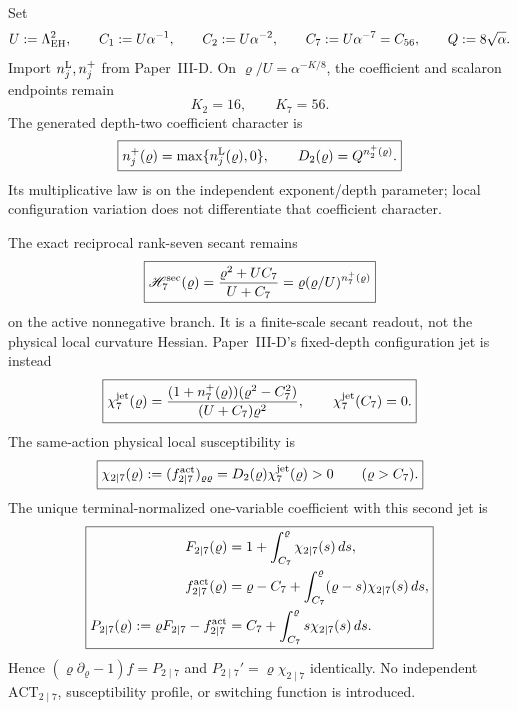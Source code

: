 \documentclass[12pt,a4paper]{article}
\begin{document}
\begin{theorem}
\label{p8:thm:complementary-laurent-action}
Set
\[
 U:=\Lambda_{\rm EH}^{2},\qquad C_1:=U\alpha^{-1},\qquad C_2:=U\alpha^{-2},\qquad
 C_7:=U\alpha^{-7}=C_{56},\qquad Q:=8\sqrt\alpha .
\]
Import $n_j^{\rm L},n_j^+$ from Paper~III-D.  On
$\varrho/U=\alpha^{-K/8}$, the coefficient and scalaron endpoints remain
\begin{equation}
\label{p8:eq:laur17-clock-symmetry}
 K_2=16,\qquad K_7=56.
\end{equation}
The generated depth-two coefficient character is
\begin{equation}
\label{p8:eq:laur17-D1}
 \boxed{
 n_j^+(\varrho)=\max\{n_j^{\rm L}(\varrho),0\},\qquad
 D_2(\varrho)=Q^{n_2^+(\varrho)}.}
\end{equation}
Its multiplicative law is on the independent exponent/depth parameter; local
configuration variation does not differentiate that coefficient character.

The exact reciprocal rank-seven secant remains
\begin{equation}
\label{p8:eq:laur17-active-response}
 \boxed{\mathscr H_7^{\rm sec}(\varrho)
 =\frac{\varrho^2+UC_7}{U+C_7}
 =\varrho(\varrho/U)^{n_7^+(\varrho)}}
\end{equation}
on the active nonnegative branch.  It is a finite-scale secant readout, not the
physical local curvature Hessian.  Paper~III-D's fixed-depth configuration jet
is instead
\begin{equation}
\label{p8:eq:laur17-local-jet}
 \boxed{
 \chi_7^{\rm jet}(\varrho)
 =\frac{(1+n_7^+(\varrho))(\varrho^2-C_7^2)}
 {(U+C_7)\varrho^2},\qquad \chi_7^{\rm jet}(C_7)=0.}
\end{equation}
The same-action physical local susceptibility is
\begin{equation}
\label{p8:eq:laur17-chi}
 \boxed{
 \chi_{2\mid7}(\varrho)
 :=(f_{2\mid7}^{\rm act})_{\varrho\varrho}
 =D_2(\varrho)\chi_7^{\rm jet}(\varrho)>0\qquad(\varrho>C_7).}
\end{equation}
The unique terminal-normalized one-variable coefficient with this second jet is
\begin{equation}
\label{p8:eq:laur17-active-action}
 \boxed{
 \begin{aligned}
 F_{2\mid7}(\varrho)
 &=1+\int_{C_7}^{\varrho}\chi_{2\mid7}(s)\,ds,\\
 f_{2\mid7}^{\rm act}(\varrho)
 &=\varrho-C_7+\int_{C_7}^{\varrho}(\varrho-s)\chi_{2\mid7}(s)\,ds,\\
 P_{2\mid7}(\varrho):=\varrho F_{2\mid7}-f_{2\mid7}^{\rm act}
 &=C_7+\int_{C_7}^{\varrho}s\chi_{2\mid7}(s)\,ds.
 \end{aligned}}
\end{equation}
Hence $(\varrho\partial_\varrho-1)f=P_{2\mid7}$ and
$P_{2\mid7}'=\varrho\chi_{2\mid7}$ identically.  No independent
$\mathrm{ACT}_{2\mid7}$, susceptibility profile, or switching function is
introduced.


\end{theorem}
\end{document}
